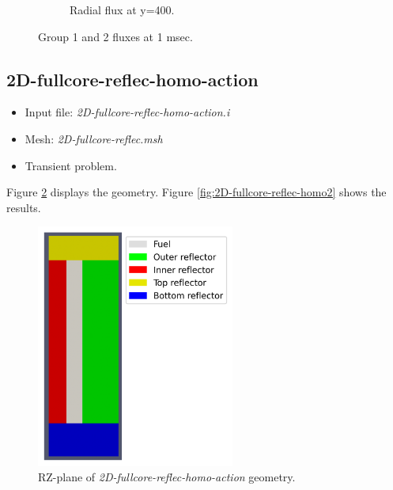 \documentclass[11pt,letterpaper]{article}
\begin{document}
\begin{figure}[htbp!]
\begin{subfigure}[t]{0.4\textwidth}
			\caption{Radial flux at y=400.}
		\end{subfigure}
		\hfill
		\caption{Group 1 and 2 fluxes at 1 msec.}
		\label{fig:2D-fullcore-reflec2}
	\end{figure}

\subsection{2D-fullcore-reflec-homo-action}

	\begin{itemize}
		\item Input file: \textit{2D-fullcore-reflec-homo-action.i}
		\item Mesh: \textit{2D-fullcore-reflec.msh}
		\item Transient problem.
	\end{itemize}

Figure \ref{fig:2D-fullcore-reflec-homo} displays the geometry.
Figure \ref{fig:2D-fullcore-reflec-homo2} shows the results.

	\begin{figure}[htbp!]
		\centering
		\includegraphics[height=8cm]{2D-fullcore-reflec-homo-mesh}
		\caption{RZ-plane of \textit{2D-fullcore-reflec-homo-action} geometry.}
		\label{fig:2D-fullcore-reflec-homo}
	\end{figure}
\end{document}
